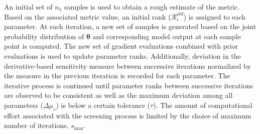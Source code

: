 
An initial set of $n_1$ samples is used to obtain a rough estimate
of the metric.  
Based on the associated metric value, an initial
rank ($\mathcal{R}_i^{old}$) is assigned to each parameter. At each iteration,
a new set of samples is generated based on the joint probability distribution
of $\bm{\theta}$ and corresponding model
output at each sample point is computed. The new set of gradient evaluations
combined with prior evaluations is used to update parameter ranks. Additionally,
deviation in the derivative-based sensitivity measure between successive iterations
normalized by the measure in the previous iteration is recorded for each parameter.
The iterative process is continued until parameter ranks between successive iterations
are observed to be consistent as well as the maximum deviation among all parameters
($\Delta\mu_s$) is below a certain tolerance ($\tau$). The amount of computational
effort associated with the screening process is limited
by the choice of maximum number of iterations, $s_\text{max}$. 

